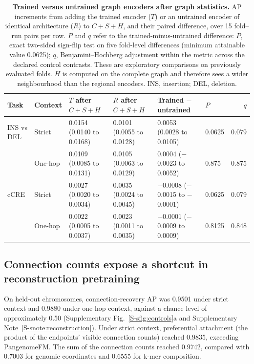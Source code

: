 \documentclass[11pt]{article}
\newcommand{\method}{PangenomeFM\xspace}
\begin{document}
\begin{bibunit}[unsrtnat]
\begin{table}[tbp]
\centering
\caption{\textbf{Trained versus untrained graph encoders after graph statistics.} AP increments from adding the trained encoder ($T$) or an untrained encoder of identical architecture ($R$) to $C+S+H$, and their paired difference, over 15 fold--run pairs per row. $P$ and $q$ refer to the trained-minus-untrained difference: $P$, exact two-sided sign-flip test on five fold-level differences (minimum attainable value 0.0625); $q$, Benjamini--Hochberg adjustment within the metric across the declared control contrasts. These are exploratory comparisons on previously evaluated folds. $H$ is computed on the complete graph and therefore sees a wider neighbourhood than the regional encoders. INS, insertion; DEL, deletion.}
\label{tab:controls}
\footnotesize
\setlength{\tabcolsep}{3.5pt}
\begin{tabular}{@{}llllllr@{}}
\toprule
Task & Context & $T$ after $C+S+H$ & $R$ after $C+S+H$ & Trained $-$ untrained & $P$ & $q$ \\
\midrule
INS vs DEL & Strict & 0.0154 (0.0140 to 0.0168) & 0.0101 (0.0055 to 0.0128) & 0.0053 (0.0028 to 0.0105) & 0.0625 & 0.079 \\
 & One-hop & 0.0109 (0.0085 to 0.0131) & 0.0105 (0.0063 to 0.0129) & 0.0004 ($-$0.0023 to 0.0052) & 0.875 & 0.875 \\
cCRE & Strict & 0.0027 (0.0020 to 0.0034) & 0.0035 (0.0024 to 0.0045) & $-$0.0008 ($-$0.0015 to $-$0.0001) & 0.0625 & 0.079 \\
 & One-hop & 0.0022 (0.0005 to 0.0037) & 0.0023 (0.0011 to 0.0035) & $-$0.0001 ($-$0.0009 to 0.0009) & 0.8125 & 0.848 \\
\bottomrule
\end{tabular}
\end{table}

\subsection{Connection counts expose a shortcut in reconstruction pretraining}
\label{sec:shortcut-result}

On held-out chromosomes, connection-recovery AP was 0.9501 under strict context and 0.9880 under one-hop context, against a chance level of approximately 0.50 (Supplementary Fig.~\ref{S-sfig:controls}a and Supplementary Note~\ref{S-snote:reconstruction}). Under strict context, preferential attachment (the product of the endpoints' visible connection counts\cite{barabasi1999emergence,libennowell2007link}) reached 0.9835, exceeding \method. The sum of the connection counts reached 0.9742, compared with 0.7003 for genomic coordinates and 0.6555 for k-mer composition.


\end{bibunit}
\end{document}
